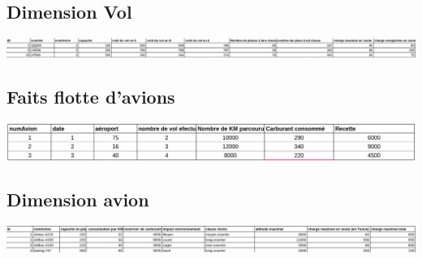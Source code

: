 \documentclass[oneside,13pt,a4paper]{article}
\begin{document}
\subsection{Dimension Vol}


  
  \includegraphics[width=1\textwidth]{img/vol.png}
  




\subsection{Faits flotte d'avions}

  
  \includegraphics[width=1\textwidth]{img/faitsStockAvions.png}
  


\subsection{Dimension avion}


  
  \includegraphics[width=1\textwidth]{img/avion.png}
  
\end{document}
